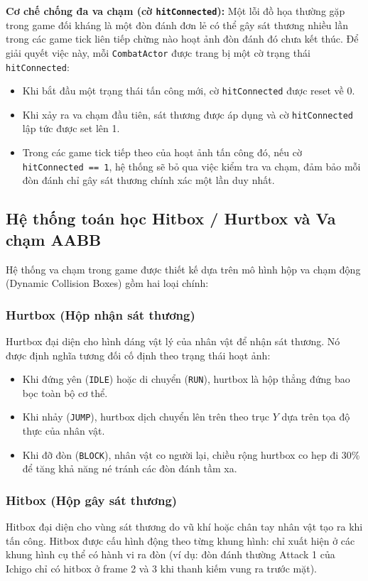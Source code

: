 \documentclass[a4paper,12pt]{report}
\begin{document}
\noindent \textbf{Cơ chế chống đa va chạm (cờ \texttt{hitConnected}):}
Một lỗi đồ họa thường gặp trong game đối kháng là một đòn đánh đơn lẻ có thể gây sát thương nhiều lần trong các game tick liên tiếp chừng nào hoạt ảnh đòn đánh đó chưa kết thúc. Để giải quyết việc này, mỗi \texttt{CombatActor} được trang bị một cờ trạng thái \texttt{hitConnected}:
\begin{itemize}
    \item Khi bắt đầu một trạng thái tấn công mới, cờ \texttt{hitConnected} được reset về 0.
    \item Khi xảy ra va chạm đầu tiên, sát thương được áp dụng và cờ \texttt{hitConnected} lập tức được set lên 1.
    \item Trong các game tick tiếp theo của hoạt ảnh tấn công đó, nếu cờ \texttt{hitConnected == 1}, hệ thống sẽ bỏ qua việc kiểm tra va chạm, đảm bảo mỗi đòn đánh chỉ gây sát thương chính xác một lần duy nhất.
\end{itemize}

\subsection{Hệ thống toán học Hitbox / Hurtbox và Va chạm AABB}

Hệ thống va chạm trong game được thiết kế dựa trên mô hình hộp va chạm động (Dynamic Collision Boxes) gồm hai loại chính:

\subsubsection{Hurtbox (Hộp nhận sát thương)}
Hurtbox đại diện cho hình dáng vật lý của nhân vật để nhận sát thương. Nó được định nghĩa tương đối cố định theo trạng thái hoạt ảnh:
\begin{itemize}
    \item Khi đứng yên (\texttt{IDLE}) hoặc di chuyển (\texttt{RUN}), hurtbox là hộp thẳng đứng bao bọc toàn bộ cơ thể.
    \item Khi nhảy (\texttt{JUMP}), hurtbox dịch chuyển lên trên theo trục $Y$ dựa trên tọa độ thực của nhân vật.
    \item Khi đỡ đòn (\texttt{BLOCK}), nhân vật co người lại, chiều rộng hurtbox co hẹp đi 30\% để tăng khả năng né tránh các đòn đánh tầm xa.
\end{itemize}

\subsubsection{Hitbox (Hộp gây sát thương)}
Hitbox đại diện cho vùng sát thương do vũ khí hoặc chân tay nhân vật tạo ra khi tấn công. Hitbox được cấu hình động theo từng khung hình: chỉ xuất hiện ở các khung hình cụ thể có hành vi ra đòn (ví dụ: đòn đánh thường Attack 1 của Ichigo chỉ có hitbox ở frame 2 và 3 khi thanh kiếm vung ra trước mặt).
\end{document}
